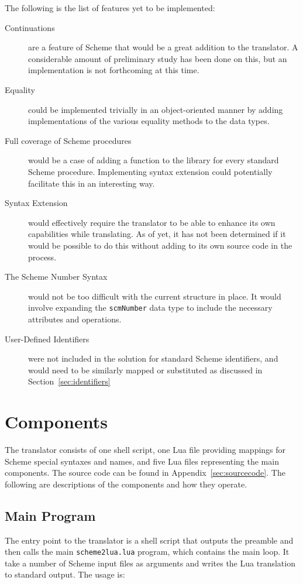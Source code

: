 The following is the list of features yet to be implemented:
\begin{description}
\item[Continuations] are a feature of Scheme that would be a great addition to
the translator. A considerable amount of preliminary study has been done on
this, but an implementation is not forthcoming at this time.
\item[Equality] could be implemented trivially in an object-oriented manner
by adding implementations of the various equality methods to the data types.
\item[Full coverage of Scheme procedures] would be a case of adding a function
to the library for every standard Scheme procedure. Implementing syntax
extension could potentially facilitate this in an interesting way.
\item[Syntax Extension] would effectively require the translator to be able to
enhance its own capabilities while translating. As of yet, it has not been
determined if it would be possible to do this without adding to its own source
code in the process.
\item[The Scheme Number Syntax] would not be too difficult with the current
structure in place. It would involve expanding the \texttt{scmNumber} data type
to include the necessary attributes and operations.
\item[User-Defined Identifiers] were not included in the solution for standard
Scheme identifiers, and would need to be similarly mapped or substituted as
discussed in Section~\ref{sec:identifiers}
\end{description}


\section{Components}

The translator consists of one shell script, one Lua file providing mappings for
Scheme special syntaxes and names, and five Lua files representing the main
components. The source code can be found in Appendix~\ref{sec:sourcecode}. The
following are descriptions of the components and how they operate.

\subsection{Main Program}

The entry point to the translator is a shell script that outputs the preamble
and then calls the main \texttt{scheme2lua.lua} program, which contains the main
loop. It take a number of Scheme input files as arguments and writes the Lua
translation to standard output. The usage is:

